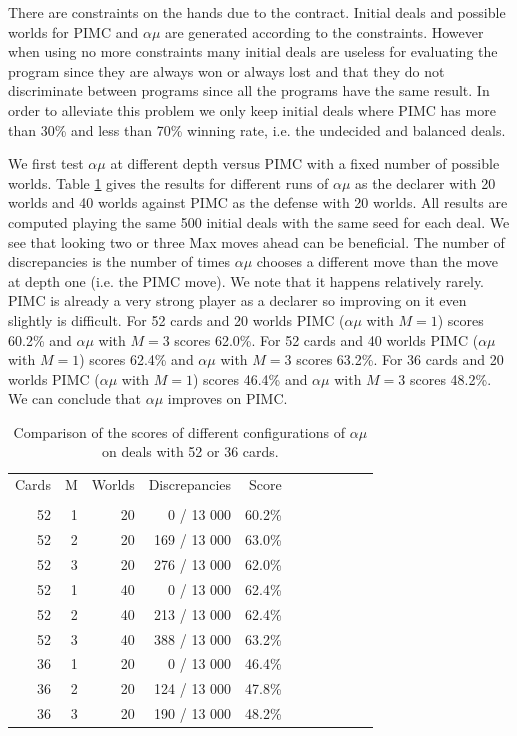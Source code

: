 \documentclass{ecai}
\begin{document}
There are constraints on the hands due to the contract. Initial deals
and possible worlds for PIMC and $\alpha\mu$ are generated according
to the constraints. However when using no more constraints many
initial deals are useless for evaluating the program since they are
always won or always lost and that they do not discriminate between
programs since all the programs have the same result. In order to
alleviate this problem we only keep initial deals where PIMC has more
than 30\% and less than 70\% winning rate, i.e. the undecided and
balanced deals.

We first test $\alpha\mu$ at different depth versus PIMC with a fixed
number of possible worlds. Table \ref{table13cardsScore} gives the
results for different runs of $\alpha\mu$ as the declarer with 20
worlds and 40 worlds against PIMC as the defense with 20 worlds. All
results are computed playing the same 500 initial deals with the same
seed for each deal. We see that looking two or three Max moves ahead
can be beneficial. The number of discrepancies is the number of times
$\alpha\mu$ chooses a different move than the move at depth one
(i.e. the PIMC move). We note that it happens relatively rarely. PIMC
is already a very strong player as a declarer so improving on it even
slightly is difficult. For 52 cards and 20 worlds PIMC ($\alpha\mu$
with $M=1$) scores 60.2\% and $\alpha\mu$ with $M=3$ scores
62.0\%. For 52 cards and 40 worlds PIMC ($\alpha\mu$ with $M=1$)
scores 62.4\% and $\alpha\mu$ with $M=3$ scores 63.2\%. For 36 cards
and 20 worlds PIMC ($\alpha\mu$ with $M=1$) scores 46.4\% and
$\alpha\mu$ with $M=3$ scores 48.2\%. We can conclude that $\alpha\mu$
improves on PIMC.

\begin{table}
  \centering
  \caption{Comparison of the scores of different configurations of
  $\alpha\mu$ on deals with 52 or 36 cards.}
  \label{table13cardsScore}
  \begin{tabular}{rrrrrrrrrrr}
Cards & M & Worlds & Discrepancies &  Score \\
      &   &        &               &        \\
   52 & 1 &     20 &    0 / 13 000 & 60.2\% \\
   52 & 2 &     20 &  169 / 13 000 & 63.0\% \\
   52 & 3 &     20 &  276 / 13 000 & 62.0\% \\
   52 & 1 &     40 &    0 / 13 000 & 62.4\% \\
   52 & 2 &     40 &  213 / 13 000 & 62.4\% \\
   52 & 3 &     40 &  388 / 13 000 & 63.2\% \\
   36 & 1 &     20 &    0 / 13 000 & 46.4\% \\
   36 & 2 &     20 &  124 / 13 000 & 47.8\% \\
   36 & 3 &     20 &  190 / 13 000 & 48.2\% \\
  \end{tabular}
\end{table}
\end{document}
